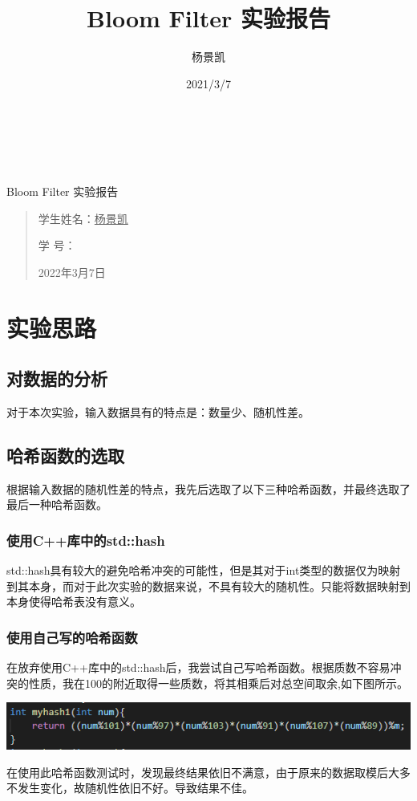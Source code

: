 \documentclass[UTF8]{ctexart}
\date{}
\title{Bloom Filter 实验报告}
\author{杨景凯}
\date{2021/3/7}
\begin{document}
 
\begin{center}
    \quad \\
    \quad \\
    \quad \\
    \vskip 3.5cm
    \heiti {} Bloom Filter 实验报告\\
\end{center}
\vskip 3.5cm
\begin{quotation}
    \songti \fontsize{30}{30}
    \doublespacing
    \par\setlength\parindent{12em}
    \quad 
\begin{center}

    学生姓名：\underline{\qquad    \quad \quad 杨景凯    \quad  \quad\qquad }

    学\hspace{0.61cm} 号：\underline{\quad \quad{}\quad\quad}

\end{center}
    
    \centering
    2022年3月7日
\end{quotation}
\clearpage
\tableofcontents
\clearpage
\section{实验思路}
\subsection{对数据的分析}
对于本次实验，输入数据具有的特点是：数量少、随机性差。
\subsection{哈希函数的选取}
根据输入数据的随机性差的特点，我先后选取了以下三种哈希函数，并最终选取了最后一种哈希函数。
\subsubsection{使用C++库中的std::hash}
std::hash具有较大的避免哈希冲突的可能性，但是其对于int类型的数据仅为映射到其本身，而对于此次实验的数据来说，不具有较大的随机性。只能将数据映射到本身使得哈希表没有意义。
\subsubsection{使用自己写的哈希函数}
在放弃使用C++库中的std::hash后，我尝试自己写哈希函数。根据质数不容易冲突的性质，我在100的附近取得一些质数，将其相乘后对总空间取余,如下图所示。
\begin{center}
    \includegraphics[scale=0.7]{hash1.png}
\end{center}
在使用此哈希函数测试时，发现最终结果依旧不满意，由于原来的数据取模后大多不发生变化，故随机性依旧不好。导致结果不佳。
\end{document}
